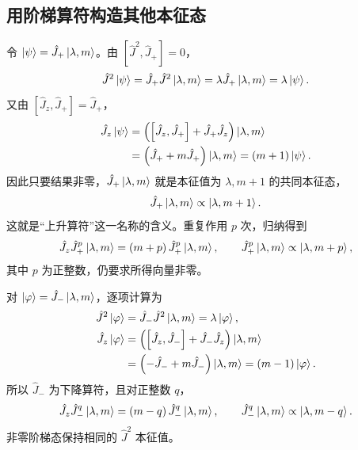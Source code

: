 \subsection{用阶梯算符构造其他本征态}
令 $\Ket{\psi}=\hat J_+\Ket{\lambda,m}$。由 $\left[\hat J^2,\hat J_+\right]=0$，
\begin{equation}
\hat J^2\Ket{\psi}=\hat J_+\hat J^2\Ket{\lambda,m}
=\lambda\hat J_+\Ket{\lambda,m}=\lambda\Ket{\psi}.
\end{equation}
又由 $\left[\hat J_z,\hat J_+\right]=\hat J_+$，
\begin{align}
\hat J_z\Ket{\psi}
&=\left(\left[\hat J_z,\hat J_+\right]+\hat J_+\hat J_z\right)\Ket{\lambda,m}\notag\\
&=\left(\hat J_++m\hat J_+\right)\Ket{\lambda,m}
=\left(m+1\right)\Ket{\psi}.
\end{align}
因此只要结果非零，$\hat J_+\Ket{\lambda,m}$ 就是本征值为 $\lambda,m+1$ 的共同本征态，
\begin{equation}
\hat J_+\Ket{\lambda,m}\propto\Ket{\lambda,m+1}.
\end{equation}
这就是“上升算符”这一名称的含义。重复作用 $p$ 次，归纳得到
\begin{equation}
\hat J_z\hat J_+^p\Ket{\lambda,m}
=\left(m+p\right)\hat J_+^p\Ket{\lambda,m},\qquad
\hat J_+^p\Ket{\lambda,m}\propto\Ket{\lambda,m+p},
\end{equation}
其中 $p$ 为正整数，仍要求所得向量非零。

对 $\Ket{\varphi}=\hat J_-\Ket{\lambda,m}$，逐项计算为
\begin{align}
\hat J^2\Ket{\varphi}&=\hat J_-\hat J^2\Ket{\lambda,m}=\lambda\Ket{\varphi},\\
\hat J_z\Ket{\varphi}
&=\left(\left[\hat J_z,\hat J_-\right]+\hat J_-\hat J_z\right)\Ket{\lambda,m}\notag\\
&=\left(-\hat J_-+m\hat J_-\right)\Ket{\lambda,m}
=\left(m-1\right)\Ket{\varphi}.
\end{align}
所以 $\hat J_-$ 为下降算符，且对正整数 $q$，
\begin{equation}
\hat J_z\hat J_-^q\Ket{\lambda,m}
=\left(m-q\right)\hat J_-^q\Ket{\lambda,m},\qquad
\hat J_-^q\Ket{\lambda,m}\propto\Ket{\lambda,m-q}.
\end{equation}
非零阶梯态保持相同的 $\hat J^2$ 本征值。


